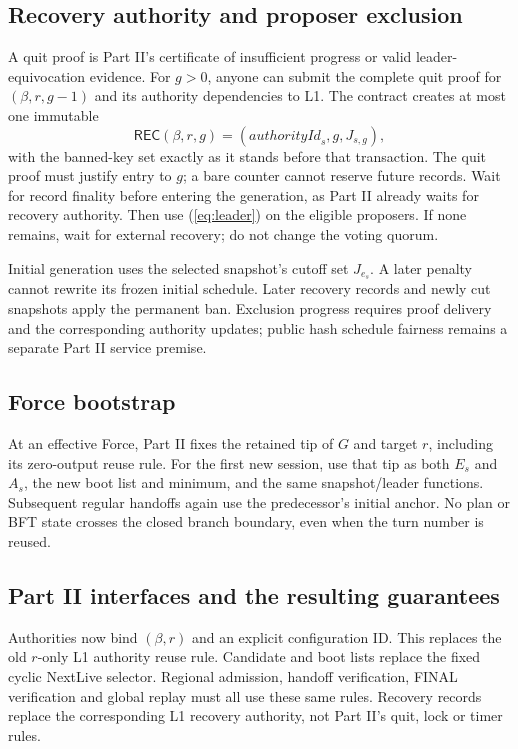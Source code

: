 \documentclass[11pt,a4paper]{article}
\newcommand{\tagg}[1]{\mathsf{#1}}
\begin{document}
\subsection{Recovery authority and proposer exclusion}
A quit proof is Part II's certificate of insufficient progress or valid
leader-equivocation evidence. For $g>0$, anyone can submit the complete
quit proof for $(\beta,r,g-1)$ and its authority dependencies to L1.
The contract creates at most one immutable
\[
 \tagg{REC}(\beta,r,g)=(\mathit{authorityId}_s,g,J_{s,g}),
\]
with the banned-key set exactly as it stands before that transaction.
The quit proof must justify entry to $g$; a bare counter cannot reserve
future records. Wait for record finality before entering the generation,
as Part II already waits for recovery authority. Then use
(\ref{eq:leader}) on the eligible proposers. If none remains, wait for
external recovery; do not change the voting quorum.

Initial generation uses the selected snapshot's cutoff set $J_{e_s}$.
A later penalty cannot rewrite its frozen initial schedule. Later recovery
records and newly cut snapshots apply the permanent ban. Exclusion progress
requires proof delivery and the corresponding authority updates; public
hash schedule fairness remains a separate Part II service premise.

\subsection{Force bootstrap}
At an effective Force, Part II fixes the retained tip of $G$ and target
$r$, including its zero-output reuse rule. For the first new session, use
that tip as both $E_s$ and $A_s$, the new boot list and minimum, and the
same snapshot/leader functions. Subsequent regular handoffs again use the
predecessor's initial anchor. No plan or BFT state crosses the closed
branch boundary, even when the turn number is reused.

\newpage
\subsection{Part II interfaces and the resulting guarantees}
Authorities now bind $(\beta,r)$ and an explicit configuration ID.
This replaces the old $r$-only L1 authority reuse rule. Candidate and boot
lists replace the fixed cyclic NextLive selector. Regional admission,
handoff verification, FINAL verification and global replay must all use
these same rules. Recovery records replace the corresponding L1 recovery
authority, not Part II's quit, lock or timer rules.
\end{document}
